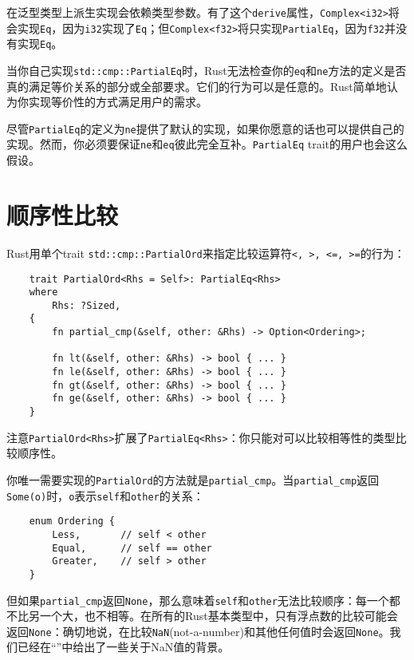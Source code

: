在泛型类型上派生实现会依赖类型参数。有了这个\texttt{derive}属性，\texttt{Complex<i32>}将会实现\texttt{Eq}，因为\texttt{i32}实现了\texttt{Eq}；但\texttt{Complex<f32>}将只实现\texttt{PartialEq}，因为\texttt{f32}并没有实现\texttt{Eq}。

当你自己实现\texttt{std::cmp::PartialEq}时，Rust无法检查你的\texttt{eq}和\texttt{ne}方法的定义是否真的满足等价关系的部分或全部要求。它们的行为可以是任意的。Rust简单地认为你实现等价性的方式满足用户的需求。

尽管\texttt{PartialEq}的定义为\texttt{ne}提供了默认的实现，如果你愿意的话也可以提供自己的实现。然而，你必须要保证\texttt{ne}和\texttt{eq}彼此完全互补。\texttt{PartialEq} trait的用户也会这么假设。

\section{顺序性比较}\label{cmp}

Rust用单个trait \texttt{std::cmp::PartialOrd}来指定比较运算符\texttt{<, >, <=, >=}的行为：
\begin{verbatim}
    trait PartialOrd<Rhs = Self>: PartialEq<Rhs>
    where
        Rhs: ?Sized,
    {
        fn partial_cmp(&self, other: &Rhs) -> Option<Ordering>;

        fn lt(&self, other: &Rhs) -> bool { ... }
        fn le(&self, other: &Rhs) -> bool { ... }
        fn gt(&self, other: &Rhs) -> bool { ... }
        fn ge(&self, other: &Rhs) -> bool { ... }
    }
\end{verbatim}

注意\texttt{PartialOrd<Rhs>}扩展了\texttt{PartialEq<Rhs>}：你只能对可以比较相等性的类型比较顺序性。

你唯一需要实现的\texttt{PartialOrd}的方法就是\texttt{partial\_cmp}。当\texttt{partial\_cmp}返回\texttt{Some(o)}时，\texttt{o}表示\texttt{self}和\texttt{other}的关系：
\begin{verbatim}
    enum Ordering {
        Less,       // self < other
        Equal,      // self == other
        Greater,    // self > other
    }
\end{verbatim}

但如果\texttt{partial\_cmp}返回\texttt{None}，那么意味着\texttt{self}和\texttt{other}无法比较顺序：每一个都不比另一个大，也不相等。在所有的Rust基本类型中，只有浮点数的比较可能会返回\texttt{None}：确切地说，在比较\texttt{NaN}(not-a-number)和其他任何值时会返回\texttt{None}。我们已经在“”中给出了一些关于NaN值的背景。


